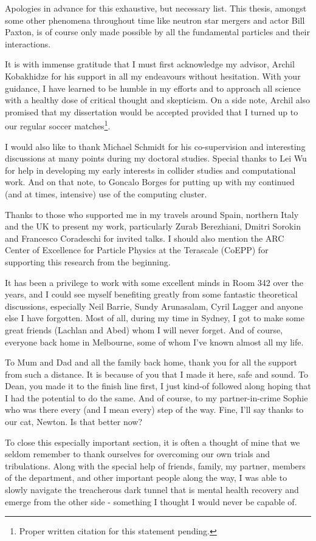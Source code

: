 \begin{acknowledgements}
\noindent
Apologies in advance for this exhaustive, but necessary list. This thesis, amongst some other phenomena throughout time like neutron star mergers and actor Bill Paxton, is of course only made possible by all the fundamental particles and their interactions.

It is with immense gratitude that I must first acknowledge my advisor, Archil Kobakhidze for his support in all my endeavours without hesitation. With your guidance, I have learned to be humble in my efforts and to approach all science with a healthy dose of critical thought and skepticism. On a side note, Archil also promised that my dissertation would be accepted provided that I turned up to our regular soccer matches\footnote{Proper written citation for this statement pending.}.

I would also like to thank Michael Schmidt for his co-supervision and interesting discussions at many points during my doctoral studies. Special thanks to Lei Wu for help in developing my early interests in collider studies and computational work. And on that note, to Goncalo Borges for putting up with my continued (and at times, intensive) use of the computing cluster.

Thanks to those who supported me in my travels around Spain, northern Italy and the UK to present my work, particularly Zurab Berezhiani, Dmitri Sorokin and Francesco Coradeschi for invited talks. I should also mention the ARC Center of Excellence for Particle Physics at the Terascale (CoEPP) for supporting this research from the beginning.

It has been a privilege to work with some excellent minds in Room 342 over the years, and I could see myself benefiting greatly from some fantastic theoretical discussions, especially Neil Barrie, Sundy Arunasalam, Cyril Lagger and anyone else I have forgotten. Most of all, during my time in Sydney, I got to make some great friends (Lachlan and Abed) whom I will never forget. And of course, everyone back home in Melbourne, some of whom I've known almost all my life.

To Mum and Dad and all the family back home, thank you for all the support from such a distance. It is because of you that I made it here, safe and sound. To Dean, you made it to the finish line first, I just kind-of followed along hoping that I had the potential to do the same. And of course, to my partner-in-crime Sophie who was there every (and I mean every) step of the way. Fine, I'll say thanks to our cat, Newton. Is that better now?

To close this especially important section, it is often a thought of mine that we seldom remember to thank ourselves for overcoming our own trials and tribulations. Along with the special help of friends, family, my partner, members of the department, and other important people along the way, I was able to slowly navigate the treacherous dark tunnel that is mental health recovery and emerge from the other side - something I thought I would never be capable of.

\end{acknowledgements}

